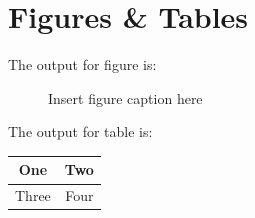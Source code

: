 \documentclass{IET}%
\newtheorem{theorem}{Theorem}
\newtheorem{condition}{Condition}
\begin{document}





\section{Figures \& Tables}

The output for figure is:

\begin{figure}[!h]
\caption{Insert figure caption here
}
\label{fig_sim}
\end{figure}


\vskip2pc

\noindent The output for table is:

\begin{table}[!h]
{%
\begin{tabular}{|c||c|}%
\hline
One & Two\\ %
\hline
Three & Four\\%
\hline
\end{tabular}}{}
\end{table}%
\end{document}
